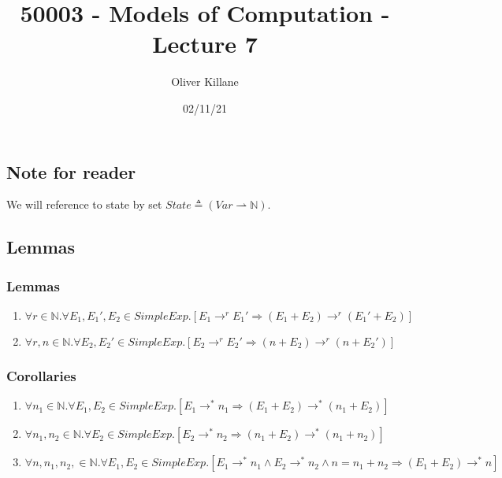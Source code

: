 \documentclass{report}
\title{50003 - Models of Computation - Lecture 7}
\author{Oliver Killane}
\date{02/11/21}
\begin{document}
    \maketitle

        \subsection*{Note for reader}
            We will reference to state by set $State \triangleq (Var \rightharpoonup \mathbb{N})$.
        
        \subsection*{Lemmas}
            \subsubsection*{Lemmas}
                \begin{enumerate}
                    \item $\forall r \in \mathbb{N}. \forall E_1,E_1',E_2 \in SimpleExp. [E_1 \to^r E_1' \Rightarrow (E_1 + E_2) \to^r (E_1' + E_2)]$
                    \item $\forall r,n \in \mathbb{N}. \forall E_2,E_2' \in SimpleExp . [E_2 \to^r E_2' \Rightarrow (n + E_2) \to^r (n + E_2')]$
                \end{enumerate}
            \subsubsection*{Corollaries}
                \begin{enumerate}
                    \item $\forall n_1 \in \mathbb{N} . \forall E_1, E_2 \in SimpleExp . [E_1 \to^* n_1 \Rightarrow (E_1 + E_2) \to^* (n_1 + E_2)]$
                    \item $\forall n_1, n_2 \in \mathbb{N} . \forall E_2 \in SimpleExp . [E_2 \to^* n_2 \Rightarrow (n_1 + E_2) \to^* (n_1 + n_2)]$
                    \item $\forall n,n_1, n_2, \in \mathbb{N} . \forall E_1, E_2 \in SimpleExp . [E_1 \to^* n_1 \land E_2 \to^* n_2 \land n = n_1 + n_2 \Rightarrow (E_1 + E_2) \to^* n]$
                \end{enumerate}
\end{document}
